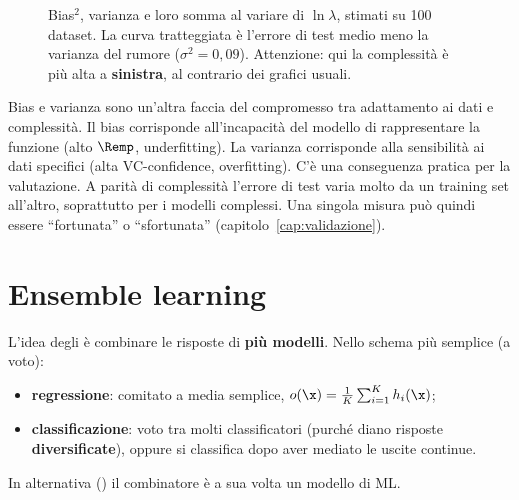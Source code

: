 \begin{figure}[ht]
\centering
{}
\caption{Bias$^2$, varianza e loro somma al variare di $\ln\lambda$, stimati su 100 dataset. La curva tratteggiata
è l'errore di test medio meno la varianza del rumore ($\sigma^2 = 0{,}09$). Attenzione: qui la complessità è più
alta a \textbf{sinistra}, al contrario dei grafici usuali.}
\label{fig:bv-tradeoff}
\end{figure}

\begin{idea}
Bias e varianza sono un'altra faccia del compromesso tra adattamento ai dati e complessità. Il bias corrisponde
all'incapacità del modello di rappresentare la funzione (alto $\Remp$, underfitting). La varianza corrisponde alla
sensibilità ai dati specifici (alta VC-confidence, overfitting). C'è una conseguenza pratica per la valutazione.
A parità di complessità l'errore di test varia molto da un training set all'altro, soprattutto per i modelli
complessi. Una singola misura può quindi essere ``fortunata'' o ``sfortunata'' (capitolo~\ref{cap:validazione}).
\end{idea}

\section{Ensemble learning}
\label{sec:ensemble}

L'idea degli  è combinare le risposte di \textbf{più modelli}. Nello schema più semplice (a
voto):
\begin{itemize}
  \item \textbf{regressione}: comitato a media semplice, $o(\x) = \frac1K\sum_{i=1}^Kh_i(\x)$;
  \item \textbf{classificazione}: voto tra molti classificatori (purché diano risposte \textbf{diversificate}),
        oppure si classifica dopo aver mediato le uscite continue.
\end{itemize}
In alternativa () il combinatore è a sua volta un modello di ML.

